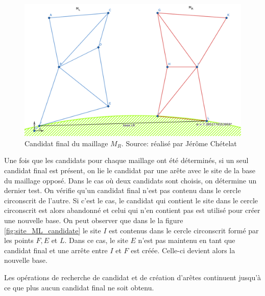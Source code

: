 \begin{figure}[htpb!]
    \centering
    \includegraphics[width=0.8\linewidth]{figures/site_MR.png}
    \caption{Candidat final du maillage $M_R$. Source: réalisé par Jérôme Chételat}
    \label{fig:site_MR_candidate}
\end{figure}

Une fois que les candidats pour chaque maillage ont été déterminés, si un seul candidat final est présent, on lie le candidat par une arête avec le site de la base du maillage opposé. Dans le cas où deux candidats sont choisis, on détermine un dernier test. On vérifie qu'un candidat final n'est pas contenu dans le cercle circonscrit de l'autre. Si c'est le cas, le candidat qui contient le site dans le cercle circonscrit est alors abandonné et celui qui n'en contient pas est utilisé pour créer une nouvelle base. On peut observer que dans le la figure \ref{fig:site_ML_candidate} le site $I$ est contenus dans le cercle circonscrit formé par les points $F, E$ et $L$. Dans ce cas, le site $E$ n'est pas maintenu en tant que candidat final et une arrête entre $I$ et $F$ est créée. Celle-ci devient alors la nouvelle base.

Les opérations de recherche de candidat et de création d'arêtes continuent jusqu'à ce que plus aucun candidat final ne soit obtenu.
